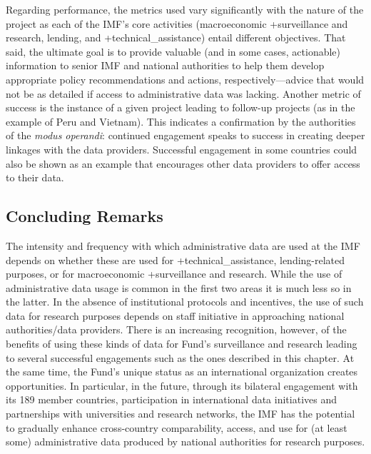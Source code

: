 \documentclass[
]{WileySix}
\begin{document}
Regarding performance, the metrics used vary significantly with the nature of the project as each of the IMF's core activities (macroeconomic +surveillance\textbar{} and research, lending, and +technical\_assistance\textbar) entail different objectives. That said, the ultimate goal is to provide valuable (and in some cases, actionable) information to senior IMF and national authorities to help them develop appropriate policy recommendations and actions, respectively---advice that would not be as detailed if access to administrative data was lacking. Another metric of success is the instance of a given project leading to follow-up projects (as in the example of Peru and Vietnam). This indicates a confirmation by the authorities of the \emph{modus operandi}: continued engagement speaks to success in creating deeper linkages with the data providers. Successful engagement in some countries could also be shown as an example that encourages other data providers to offer access to their data.

\hypertarget{concluding-remarks-4}{%
\subsection{Concluding Remarks}\label{concluding-remarks-4}}

The intensity and frequency with which administrative data are used at the IMF depends on whether these are used for +technical\_assistance\textbar, lending-related purposes, or for macroeconomic +surveillance\textbar{} and research. While the use of administrative data usage is common in the first two areas it is much less so in the latter. In the absence of institutional protocols and incentives, the use of such data for research purposes depends on staff initiative in approaching national authorities/data providers. There is an increasing recognition, however, of the benefits of using these kinds of data for Fund's surveillance and research leading to several successful engagements such as the ones described in this chapter. At the same time, the Fund's unique status as an international organization creates opportunities. In particular, in the future, through its bilateral engagement with its 189 member countries, participation in international data initiatives and partnerships with universities and research networks, the IMF has the potential to gradually enhance cross-country comparability, access, and use for (at least some) administrative data produced by national authorities for research purposes.
\end{document}
